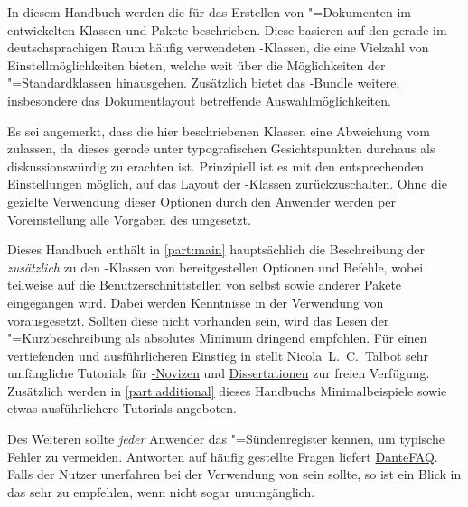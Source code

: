 \addchap[tocentry={}]{\prefacename}
In diesem Handbuch werden die für das Erstellen von "=Dokumenten 
im \href{https://tu-dresden.de/cd}{\TUDCD} entwickelten Klassen und Pakete 
beschrieben. Diese basieren auf den gerade im deutschsprachigen Raum häufig 
verwendeten \KOMAScript-Klassen, die eine Vielzahl von Einstellmöglichkeiten 
bieten, welche weit über die Möglichkeiten der "=Standardklassen 
hinausgehen. Zusätzlich bietet das \TUDScript-Bundle weitere, insbesondere das 
Dokumentlayout betreffende Auswahlmöglichkeiten.

Es sei angemerkt, dass die hier beschriebenen Klassen eine Abweichung vom 
\TUDCD zulassen, da dieses gerade unter typografischen Gesichtspunkten 
durchaus als diskussionswürdig zu erachten ist. Prinzipiell ist es mit den 
entsprechenden Einstellungen möglich, auf das Layout der \KOMAScript-Klassen 
zurückzuschalten. Ohne die gezielte Verwendung dieser Optionen durch den 
Anwender werden per Voreinstellung alle Vorgaben des \CDs umgesetzt.

Dieses Handbuch enthält in \autoref{part:main} hauptsächlich die Beschreibung 
der \emph{zusätzlich} zu den \KOMAScript-Klassen von \TUDScript bereitgestellen
Optionen und Befehle, wobei teilweise auf die Benutzerschnittstellen von 
\KOMAScript{} selbst sowie anderer Pakete eingegangen wird. Dabei werden 
Kenntnisse in der Verwendung von  vorausgesetzt. Sollten diese 
nicht vorhanden sein, wird das Lesen der "=Kurzbeschreibung 
 als absolutes 
Minimum dringend empfohlen. Für einen vertiefenden und ausführlicheren Einstieg 
in  stellt Nicola~L.~C.~Talbot sehr umfängliche Tutorials für 
\href{http://www.dickimaw-books.com/latex/novices/}{-Novizen} 
und \href{http://www.dickimaw-books.com/latex/thesis/}{Dissertationen} zur 
freien Verfügung. Zusätzlich werden in \autoref{part:additional} dieses 
Handbuchs Minimalbeispiele sowie etwas ausführlichere Tutorials angeboten.

Des Weiteren sollte \emph{jeder} Anwender das "=Sündenregister 
 kennen, um 
typische Fehler zu vermeiden. Antworten auf häufig gestellte Fragen liefert 
\href{http://projekte.dante.de/DanteFAQ/WebHome}{DanteFAQ}. Falls der Nutzer 
unerfahren bei der Verwendung von \KOMAScript sein sollte, so ist ein Blick in 
das  sehr zu empfehlen, wenn nicht sogar 
unumgänglich.

